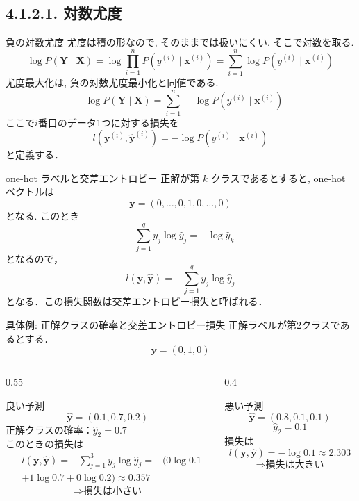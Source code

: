 \documentclass[dvipdfmx,uplatex,11pt]{beamer}
\begin{document}
\subsection{4.1.2.1. 対数尤度}
\begin{frame}{負の対数尤度}
尤度は積の形なので, そのままでは扱いにくい.
そこで対数を取る.
\[
\log P(\bm Y\mid \bm X)
=
\log
\prod_{i=1}^{n}
P(y^{(i)}\mid \bm x^{(i)})
=
\sum_{i=1}^{n}
\log P(y^{(i)}\mid \bm x^{(i)})
\]
尤度最大化は, 負の対数尤度最小化と同値である.
\[
-\log P(\bm Y\mid \bm X)
=
\sum_{i=1}^{n}
-\log P(y^{(i)}\mid \bm x^{(i)})
\]
ここで$i$番目のデータ1つに対する損失を
\[
l(\bm y^{(i)},\hat{\bm y}^{(i)})
=
-\log P(y^{(i)}\mid \bm x^{(i)})
\]
と定義する．
\end{frame}


\begin{frame}{one-hot ラベルと交差エントロピー}
正解が第 $k$ クラスであるとすると, one-hot ベクトルは
\[\bm y=(0,\dots,0,1,0,\dots,0)
\]
となる. このとき
\[
  - \sum_{j=1}^{q} y_j \log \hat{y}_j
  =
  - \log \hat{y}_k
\]
となるので，
\[
\boxed{
l(\bm y,\hat{\bm y})
=
-\sum_{j=1}^{q}
y_j\log \hat y_j
}
\]
となる．この損失関数は\alert{交差エントロピー損失}と呼ばれる．

\end{frame}


\begin{frame}[t]{具体例: 正解クラスの確率と交差エントロピー損失}
正解ラベルが第2クラスであるとする．
\[
\bm y=(0,1,0)
\]
\vspace{-8mm}
\begin{columns}[T,onlytextwidth]
\begin{column}{0.55\textwidth}
\begin{d2lbox}{良い予測}
\[
\hat{\bm y}=(0.1,0.7,0.2)
\]
正解クラスの確率：$\hat y_2=0.7$ \\
このときの損失は
\[
\begin{split}
&l(\bm{y},\hat{\bm{y}})
= - \sum_{j=1}^{3} y_j \log \hat{y}_j = - (0\log 0.1 \\
&+ 1\log 0.7 + 0\log 0.2) \approx 0.357
\end{split}
\]
\[
\Rightarrow \text{損失は小さい}
\]
\end{d2lbox}
\end{column}

\begin{column}{0.4\textwidth}
\begin{d2lbox}{悪い予測}
\[
\hat{\bm y}=(0.8,0.1,0.1)
\]
\[
\hat y_2=0.1
\]
損失は
\[
l(\bm y,\hat{\bm y})
=
-\log 0.1
\approx 2.303
\]
\[
\Rightarrow \text{損失は大きい}
\]
\end{d2lbox}
\end{column}
\end{columns}

\end{frame}
\end{document}
